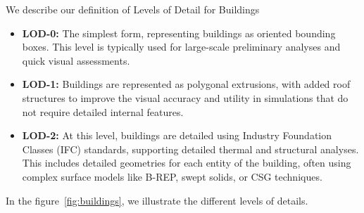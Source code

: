 \documentclass[runningheads]{llncs}
\begin{document}
We describe our definition of Levels of Detail for Buildings
\begin{itemize}
    \item \textbf{LOD-0:} The simplest form, representing buildings as oriented bounding boxes. This level is typically used for large-scale preliminary analyses and quick visual assessments.
    \item \textbf{LOD-1:} Buildings are represented as polygonal extrusions, with added roof structures to improve the visual accuracy and utility in simulations that do not require detailed internal features.
    \item \textbf{LOD-2:} At this level, buildings are detailed using Industry Foundation Classes (IFC) standards, supporting detailed thermal and structural analyses. This includes detailed geometries for each entity of the building, often using complex surface models like B-REP, swept solids, or CSG techniques.
\end{itemize}


In the figure~\ref{fig:buildings}, we illustrate the different levels of details.
\end{document}
